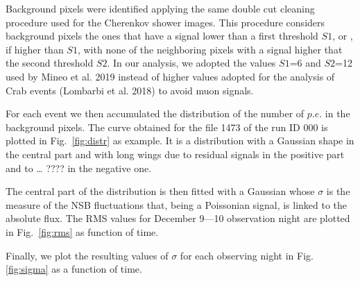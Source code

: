 Background pixels were identified applying the same double cut cleaning procedure used for the Cherenkov shower images. This procedure considers background pixels the ones that have a signal lower than a first threshold $S1$, or , if higher than $S1$, with none of the neighboring pixels with a signal higher that the second threshold $S2$. In our analysis, we adopted the values $S1$=6 and $S2$=12 used by Mineo et al. 2019 instead of higher values adopted for the analysis of Crab events (Lombarbi et al. 2018) to avoid muon signals.

For each event we then accumulated the distribution of the number of $p.e.$ in the background pixels. The curve obtained for the file 1473 of the run ID 000 is plotted in Fig.~\ref{fig:distr} as example. It is a distribution with a Gaussian shape in the central part and with long wings due to residual signals in the positive part and to … ???? in the negative one. 

The central part of the distribution is then fitted with a Gaussian whose $\sigma$ is the measure of the NSB fluctuations that, being a Poissonian signal, is linked to the absolute flux. The RMS values for December 9—10 observation night are plotted in Fig.~\ref{fig:rms} as function of time.

Finally, we plot the resulting values of $\sigma$ for each observing night in Fig.\ref{fig:sigma}  as a function of time. 


